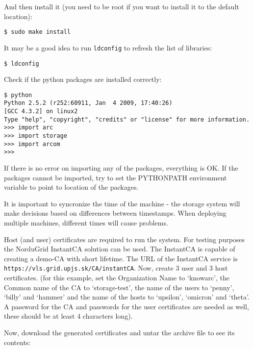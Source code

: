 \documentclass{article}
\begin{document}
And then install it (you need to be root if you want to install it to the default location):

\begin{verbatim}
$ sudo make install
\end{verbatim}

It may be a good idea to run \verb!ldconfig! to refresh the list of libraries:

\begin{verbatim}
$ ldconfig
\end{verbatim}

Check if the python packages are installed correctly:

\begin{verbatim}
$ python
Python 2.5.2 (r252:60911, Jan  4 2009, 17:40:26) 
[GCC 4.3.2] on linux2
Type "help", "copyright", "credits" or "license" for more information.
>>> import arc
>>> import storage
>>> import arcom
>>> 
\end{verbatim}

If there is no error on importing any of the packages, everything is OK. If the packages cannot be imported, try to set the PYTHONPATH environment variable to point to location of the packages.

It is important to syncronize the time of the machine - the storage system will make decisions based on differences between timestamps. When deploying multiple machines, different times will cause problems.

Host (and user) certificates are required to run the system. For testing purposes the NorduGrid InstantCA solution can be used. The InstantCA is capable of creating a demo-CA with short lifetime. The URL of the InstantCA service is \verb!https://vls.grid.upjs.sk/CA/instantCA!. Now, create 3 user and 3 host certificates. (for this example, set the Organization Name to `knowarc', the Common name of the CA to `storage-test', the name of the users to `penny', `billy' and `hammer' and the name of the hosts to `upsilon', `omicron' and `theta'. A password for the CA and passwords for the user certificates are needed as well, these should be at least 4 characters long).

Now, download the generated certificates and untar the archive file to see its contents:
\end{document}
